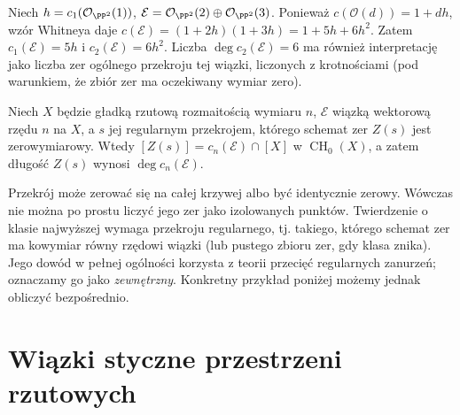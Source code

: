 \begin{przyklad}
\label{prz:ga7-chern-sum}
Niech $h=c_1(\mathcal O_{\PP^2}(1))$,
$\mathcal E=\mathcal O_{\PP^2}(2)\oplus\mathcal O_{\PP^2}(3)$.
Ponieważ $c(\mathcal O(d))=1+dh$, wzór Whitneya daje
$c(\mathcal E)=(1+2h)(1+3h)=1+5h+6h^2$.
Zatem $c_1(\mathcal E)=5h$ i $c_2(\mathcal E)=6h^2$.
Liczba $\deg c_2(\mathcal E)=6$ ma również
interpretację jako liczba zer ogólnego przekroju
tej wiązki, liczonych z krotnościami (pod warunkiem,
że zbiór zer ma oczekiwany wymiar zero).
\end{przyklad}

\begin{stwierdzenie}
\label{st:ga7-zero-section}
Niech $X$ będzie gładką rzutową rozmaitością wymiaru $n$,
$\mathcal E$ wiązką wektorową rzędu $n$ na $X$,
a $s$ jej regularnym przekrojem, którego schemat zer
$Z(s)$ jest zerowymiarowy. Wtedy
$[Z(s)]=c_n(\mathcal E)\cap[X]$ w $\operatorname{CH}_0(X)$,
a zatem długość $Z(s)$ wynosi $\deg c_n(\mathcal E)$.
\end{stwierdzenie}
\begin{uwaga}
Przekrój może zerować się na całej krzywej albo
być identycznie zerowy. Wówczas nie można po prostu
liczyć jego zer jako izolowanych punktów. Twierdzenie
o klasie najwyższej wymaga przekroju regularnego,
tj. takiego, którego schemat zer ma kowymiar równy
rzędowi wiązki (lub pustego zbioru zer, gdy klasa znika).
Jego dowód w pełnej ogólności korzysta z teorii
przecięć regularnych zanurzeń; oznaczamy go jako
\emph{zewnętrzny}. Konkretny przykład poniżej
możemy jednak obliczyć bezpośrednio.
\end{uwaga}

\section{Wiązki styczne przestrzeni rzutowych}
\label{sec:ga7-tangent}

